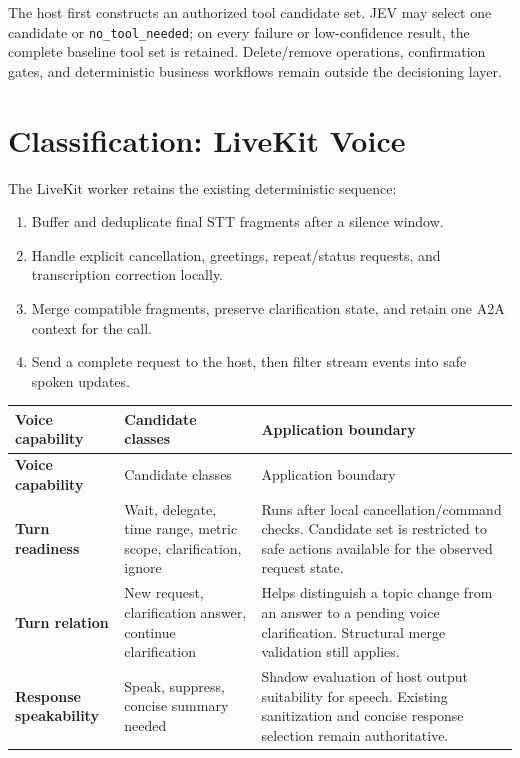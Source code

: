 \documentclass[10pt]{article}
\begin{document}
The host first constructs an authorized tool candidate set. JEV may select one candidate or \texttt{no\_tool\_needed}; on every failure or low-confidence result, the complete baseline tool set is retained. Delete/remove operations, confirmation gates, and deterministic business workflows remain outside the decisioning layer.

\section{Classification: LiveKit Voice}
The LiveKit worker retains the existing deterministic sequence:
\begin{enumerate}[leftmargin=18pt,itemsep=3pt]
\item Buffer and deduplicate final STT fragments after a silence window.
\item Handle explicit cancellation, greetings, repeat/status requests, and transcription correction locally.
\item Merge compatible fragments, preserve clarification state, and retain one A2A context for the call.
\item Send a complete request to the host, then filter stream events into safe spoken updates.
\end{enumerate}

\small
\begin{longtable}{@{}>{\bfseries\color{navy}}p{}@{\hspace{0.6em}}p{}@{\hspace{0.6em}}p{}@{}}
\toprule
Voice capability & Candidate classes & Application boundary \\
\midrule
\endfirsthead
\toprule
Voice capability & Candidate classes & Application boundary \\
\midrule
\endhead
Turn readiness & Wait, delegate, time range, metric scope, clarification, ignore & Runs after local cancellation/command checks. Candidate set is restricted to safe actions available for the observed request state. \\
Turn relation & New request, clarification answer, continue clarification & Helps distinguish a topic change from an answer to a pending voice clarification. Structural merge validation still applies. \\
Response speakability & Speak, suppress, concise summary needed & Shadow evaluation of host output suitability for speech. Existing sanitization and concise response selection remain authoritative. \\
\bottomrule
\end{longtable}
\normalsize
\end{document}

